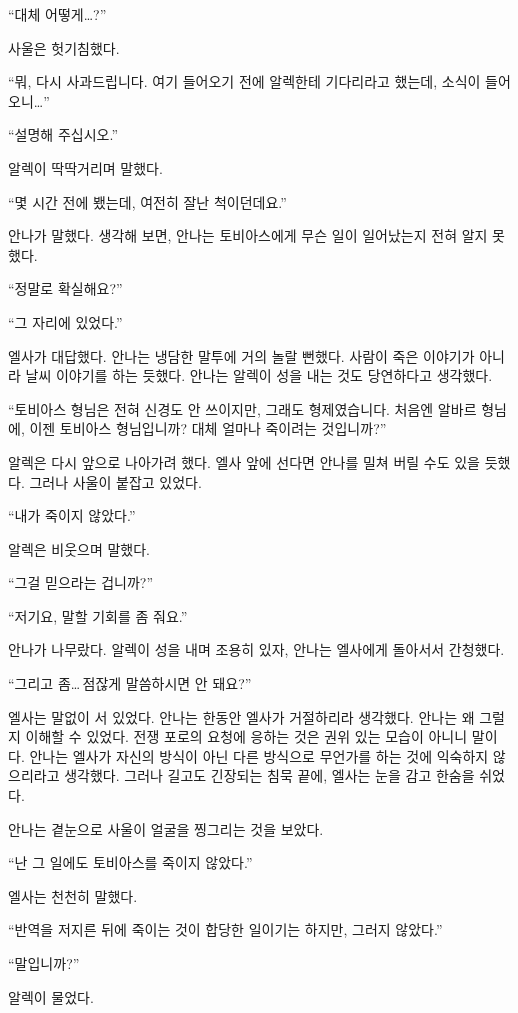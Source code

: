 ``대체 어떻게\ldots?''

사울은 헛기침했다.

``뭐, 다시 사과드립니다. 여기 들어오기 전에 알렉한테 기다리라고 했는데, 소식이 들어오니\ldots''

``설명해 주십시오.''

알렉이 딱딱거리며 말했다.

``몇 시간 전에 뵀는데, 여전히 잘난 척이던데요.''

안나가 말했다. 생각해 보면, 안나는 토비아스에게 무슨 일이 일어났는지 전혀 알지 못했다.

``정말로 확실해요?''

``그 자리에 있었다.''

엘사가 대답했다. 안나는 냉담한 말투에 거의 놀랄 뻔했다. 사람이 죽은 이야기가 아니라 날씨 이야기를 하는 듯했다. 안나는 알렉이 성을 내는 것도 당연하다고 생각했다.

``토비아스 형님은 전혀 신경도 안 쓰이지만, 그래도 형제였습니다. 처음엔 알바르 형님에, 이젠 토비아스 형님입니까? 대체 얼마나 죽이려는 것입니까?''

알렉은 다시 앞으로 나아가려 했다. 엘사 앞에 선다면 안나를 밀쳐 버릴 수도 있을 듯했다. 그러나 사울이 붙잡고 있었다.

``내가 죽이지 않았다.''

알렉은 비웃으며 말했다.

``그걸 믿으라는 겁니까?''

``저기요, 말할 기회를 좀 줘요.''

안나가 나무랐다. 알렉이 성을 내며 조용히 있자, 안나는 엘사에게 돌아서서 간청했다.

``그리고 좀\ldots\,점잖게 말씀하시면 안 돼요?''

엘사는 말없이 서 있었다. 안나는 한동안 엘사가 거절하리라 생각했다. 안나는 왜 그럴지 이해할 수 있었다. 전쟁 포로의 요청에 응하는 것은 권위 있는 모습이 아니니 말이다. 안나는 엘사가 자신의 방식이 아닌 다른 방식으로 무언가를 하는 것에 익숙하지 않으리라고 생각했다. 그러나 길고도 긴장되는 침묵 끝에, 엘사는 눈을 감고 한숨을 쉬었다.

안나는 곁눈으로 사울이 얼굴을 찡그리는 것을 보았다.

``난 그 일에도 토비아스를 죽이지 않았다.''

엘사는 천천히 말했다.

``반역을 저지른 뒤에 죽이는 것이 합당한 일이기는 하지만, 그러지 않았다.''

`` 말입니까?''

알렉이 물었다.

